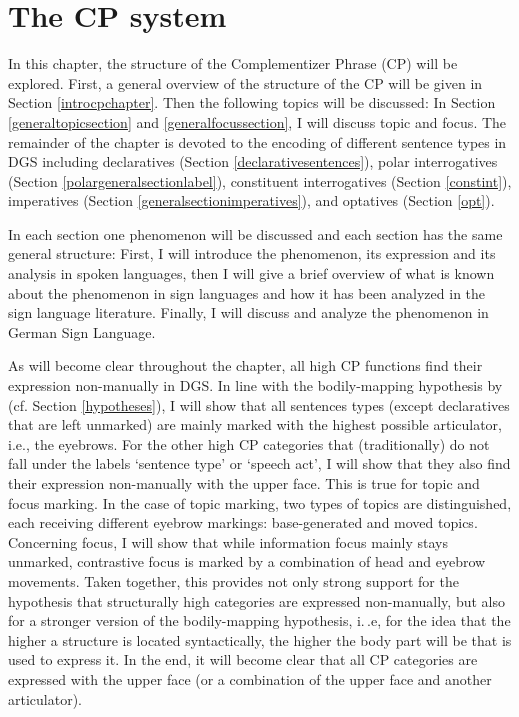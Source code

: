 \chapter{The CP system}\label{cpchapter}
In this chapter, the structure of the Complementizer Phrase (CP) will be explored. First, a general overview of the structure of the CP will be given in Section \ref{introcpchapter}. Then the following topics will be discussed: In Section \ref{generaltopicsection}  and \ref{generalfocussection}, I will discuss topic and focus. The remainder of the chapter is devoted to the encoding of different sentence types in DGS including declaratives (Section \ref{declarativesentences}), polar interrogatives (Section \ref{polargeneralsectionlabel}), constituent interrogatives (Section \ref{constint}), imperatives (Section \ref{generalsectionimperatives}), and optatives (Section \ref{opt}).

In each section one phenomenon will be discussed and each section has the same general structure: First, I will introduce the phenomenon, its expression and its analysis in spoken languages, then I will give a brief overview of what is known about the phenomenon in sign languages and how it has been analyzed in the sign language literature. Finally, I will discuss and analyze the phenomenon in German Sign Language.

As will become clear throughout the chapter, all high CP functions find their expression non-manually in DGS. In line with the bodily-mapping hypothesis by \citet{bross2017scope} (cf. Section \ref{hypotheses}), I will show that all sentences types (except declaratives that are left unmarked) are mainly marked with the highest possible articulator, i.e., the eyebrows. For the other high CP categories that (traditionally) do not fall under the labels `sentence type' or `speech act', I will show that they also find their expression non-manually with the upper face. This is true for topic and focus marking. In the case of topic marking, two types of topics are distinguished, each receiving different eyebrow markings: base-generated and moved topics. Concerning focus, I will show that while information focus mainly stays unmarked, contrastive focus is marked by a combination of head and eyebrow movements. Taken together, this provides not only strong support for the hypothesis that structurally high categories are expressed non-manually, but also for a stronger version of the bodily-mapping hypothesis, i.\,.e, for the idea that the higher a structure is located syntactically, the higher the body part will be that is used to express it. In the end, it will become clear that all CP categories are expressed with the upper face (or a combination of the upper face and another articulator).

